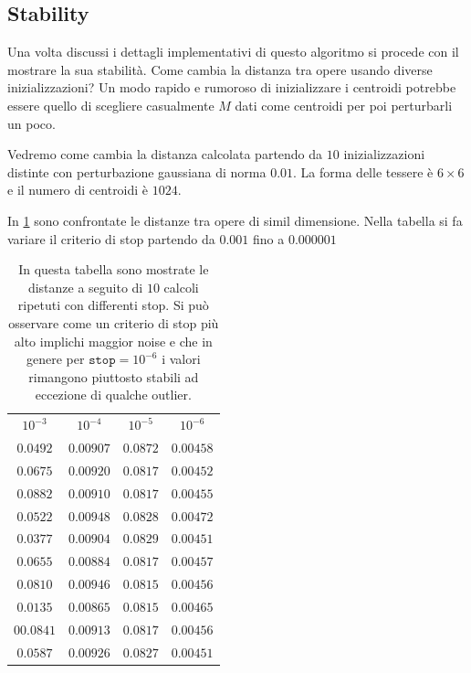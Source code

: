\begin{toDo}
	\subsection{Stability}
	Una volta discussi i dettagli implementativi di questo algoritmo si procede con il mostrare la sua stabilità. Come cambia la distanza tra opere usando diverse inizializzazioni? Un modo rapido e rumoroso di inizializzare i centroidi potrebbe essere quello di scegliere casualmente $M$ dati come centroidi per poi perturbarli un poco.

	\noindent Vedremo come cambia la distanza calcolata partendo da $10$ inizializzazioni distinte con perturbazione gaussiana di norma $0.01$. La forma delle tessere è $6\times6$ e il numero di centroidi è $\num{1024}$.

	\noindent In \cref{tab:distStability} sono confrontate le distanze tra opere di simil dimensione. Nella tabella si fa variare il criterio di stop partendo da $0.001$ fino a $0.000001$

	\begin{table}[h]
		\centering
		\begin{tabular}{|c|c|c|c|}
			\hline
			\rowcolor{ambra}
			\multicolumn{4}{|c|}{stop criteria} \\
			\hline
			\rowcolor{lavender}
			$10^{-3}$ & $10^{-4}$ & $10^{-5}$ & $10^{-6}$ \\
			\hline
			$\num{0.0492}$ & $\num{0.00907}$ & $\num{0.0872}$ & $\num{0.00458}$ \\
			\hline
			$\num{0.0675}$ & $\num{0.00920}$ & $\num{0.0817}$ & $\num{0.00452}$ \\
			\hline
			$\num{0.0882}$ & $\num{0.00910}$ & $\num{0.0817}$ & $\num{0.00455}$ \\
			\hline
			$\num{0.0522}$ & $\num{0.00948}$ & $\num{0.0828}$ & $\num{0.00472}$ \\
			\hline
			$\num{0.0377}$ & $\num{0.00904}$ & $\num{0.0829}$ & $\num{0.00451}$ \\
			\hline
			$\num{0.0655}$ & $\num{0.00884}$ & $\num{0.0817}$ & $\num{0.00457}$ \\
			\hline
			$\num{0.0810}$ & $\num{0.00946}$ & $\num{0.0815}$ & $\num{0.00456}$ \\
			\hline
			$\num{0.0135}$ & $\num{0.00865}$ & $\num{0.0815}$ & $\num{0.00465}$ \\
			\hline
			$\num{00.0841}$ & $\num{0.00913}$ & $\num{0.0817}$ & $\num{0.00456}$  \\
			\hline
			$\num{0.0587}$ & $\num{0.00926}$ & $\num{0.0827}$ & $\num{0.00451}$ \\
			\hline
		\end{tabular}
		\caption[Stability of comparison algorithm]{In questa tabella sono mostrate le distanze a seguito di $10$ calcoli ripetuti con differenti stop. Si può osservare come un criterio di stop più alto implichi maggior noise e che in genere per $\texttt{stop}=10^{-6}$ i valori rimangono piuttosto stabili ad eccezione di qualche outlier.}
		\label{tab:distStability}
	\end{table}


\end{toDo}
